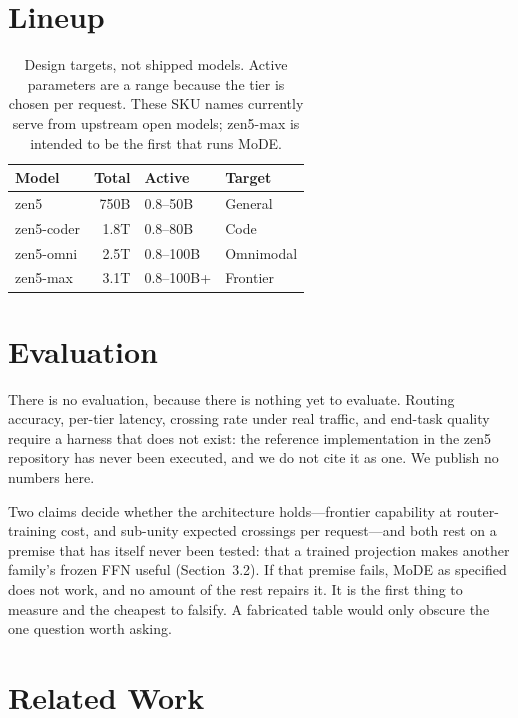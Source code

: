 \documentclass[11pt,a4paper]{article}
\begin{document}
\section{Lineup}

\begin{table}[H]
\centering
\caption{Design targets, not shipped models. Active parameters are a range because the tier
is chosen per request. These SKU names currently serve from upstream open models; zen5-max is
intended to be the first that runs MoDE.}
\begin{tabular}{lrll}
\toprule
\textbf{Model} & \textbf{Total} & \textbf{Active} & \textbf{Target} \\
\midrule
zen5       & 750B & 0.8--50B   & General \\
zen5-coder & 1.8T & 0.8--80B   & Code \\
zen5-omni  & 2.5T & 0.8--100B  & Omnimodal \\
zen5-max   & 3.1T & 0.8--100B+ & Frontier \\
\bottomrule
\end{tabular}
\end{table}

\section{Evaluation}

There is no evaluation, because there is nothing yet to evaluate. Routing accuracy,
per-tier latency, crossing rate under real traffic, and end-task quality require a
harness that does not exist: the reference implementation in the zen5 repository has
never been executed, and we do not cite it as one. We publish no numbers here.

Two claims decide whether the architecture holds---frontier capability at
router-training cost, and sub-unity expected crossings per request---and both rest on a
premise that has itself never been tested: that a trained projection makes another
family's frozen FFN useful (Section~3.2). If that premise fails, MoDE as specified does
not work, and no amount of the rest repairs it. It is the first thing to measure and the
cheapest to falsify. A fabricated table would only obscure the one question worth asking.

\section{Related Work}
\end{document}
